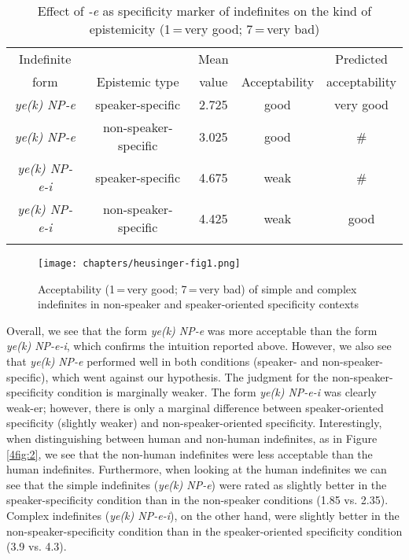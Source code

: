 \documentclass[output=paper]{langsci/langscibook}
\begin{document}
\begin{table}[H]
\centering
{\small{
\begin{tabular}{ccccc}
\lsptoprule
Indefinite	& 				& Mean	& 			& Predicted\\
form		& Epistemic type	& value	& Acceptability	& acceptability \\
\midrule
{\emph{ye(k) NP-e}} & speaker-specific & 2.725 & good & very good \\
{\emph{ye(k) NP-e}} & non-speaker-specific & 3.025 & good & \# \\ 
{\emph{ye(k) NP-e-i}} & speaker-specific & 4.675 & weak & \# \\
{\emph{ye(k) NP-e-i}} & non-speaker-specific & 4.425 & weak & good \\
\lspbottomrule
\end{tabular}
}}
\caption{Effect of {\emph{-e}} as specificity marker of indefinites on the kind of epistemicity (1\,=\,very good; 7\,=\,very bad)}\label{4table:7}
\end{table}

\begin{figure}[H]
\centering
\texttt{[image: chapters/heusinger-fig1.png]}
\caption{{Acceptability (1\,=\,very good; 7\,=\,very bad) of simple and complex indefinites in non-speaker and speaker-oriented specificity contexts}}\label{4fig:1}
\end{figure}

{
Overall, we see that the form {\emph{ye(k) NP-e}} was more acceptable than the form {\emph{ye(k) NP-e-i}}, which confirms the intuition reported above. However, we also see that {\emph{ye(k)}} \mbox{\emph{NP-e}} performed well in both conditions (speaker- and non-speaker-specific), which went against our hypothesis. The judgment for the non-speaker-specificity condition is marginally weaker. The form {\emph{ye(k) NP-e-i}} was clearly weak-er; however, there is only a marginal difference between speaker-oriented specificity (slightly weaker) and non-speaker-oriented specificity. Interestingly, when distinguishing between human and non-human indefinites, as in Figure \ref{4fig:2}, we see that the non-human indefinites were less acceptable than the human indefinites. Furthermore, when looking at the human indefinites we can see that the simple indefinites ({\emph{ye(k) NP-e}}) were rated as slightly better in the speaker-specificity condition than in the non-speaker conditions (1.85 vs. 2.35). Complex indefinites ({\emph{ye(k) NP-e-i}}), on the other hand, were slightly better in the non-speaker-specificity condition than in the speaker-oriented specificity condition (3.9 vs. 4.3).
}
\end{document}
